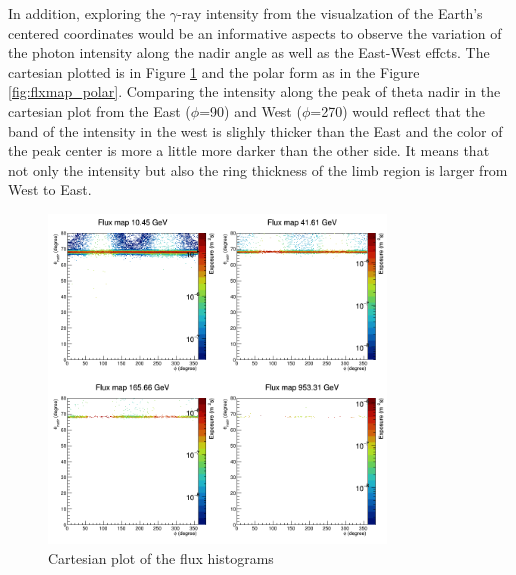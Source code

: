 \newpage

In addition, exploring the $\gamma$-ray intensity from the visualzation
of the Earth's centered coordinates would be an informative aspects
to observe the variation of the photon intensity along the nadir angle as well as the 
East-West effcts. The cartesian plotted is in Figure
\ref{fig:flxmap_cartesian} and the polar form as in the Figure 
\ref{fig:flxmap_polar}. Comparing the intensity along the peak of 
theta nadir in the cartesian plot from the East ($\phi$=90\textdegree)
and West ($\phi$=270\textdegree) would reflect that the band of 
the intensity in the west is slighly thicker than the East and the 
color of the peak center is more a little more darker than the other 
side. It means that not only the intensity but also the ring thickness
of the limb region is larger from West to East.


\begin{figure}[h!]
    \centering
    \includegraphics[width=0.8\textwidth]{content/result_and_discussion/figures/cartesian_flxmaps.png}
    \caption{Cartesian plot of the flux histograms}
    \label{fig:flxmap_cartesian}
\end{figure}


